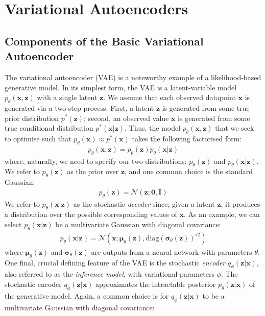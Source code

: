 \documentclass[ oneside,%
                    author={George Herbert},
                    degree={MSci},
                     title={Diffusion Models for Time-Evolving Precipitation Fields},
                  subtitle={}]{dissertation}
\begin{document}
\section{Variational Autoencoders}
\label{sec:background_vae}

\subsection{Components of the Basic Variational Autoencoder}
\label{sec:background_vae_latent}

The variational autoencoder (VAE) \cite{Autoencoding_Variational_Bayes_Kingma, Stochastic_Backpropagation_Rezende} is a noteworthy example of a likelihood-based generative model. In its simplest form, the VAE is a latent-variable model $p_\theta(\mathbf{x},\mathbf{z})$ with a single latent $\mathbf{z}$. We assume that each observed datapoint $\mathbf{x}$ is generated via a two-step process. First, a latent $\mathbf{z}$ is generated from some true prior distribution $p^*(\mathbf{z})$; second, an observed value $\mathbf{x}$ is generated from some true conditional distribution $p^*(\mathbf{x}|\mathbf{z})$. Thus, the model $p_\theta(\mathbf{x},\mathbf{z})$ that we seek to optimise such that $p_\theta(\mathbf{x})\approx p^*(\mathbf{x})$ takes the following factorised form:
\begin{align}
      p_\theta(\mathbf{x},\mathbf{z})=p_\theta(\mathbf{z})p_\theta(\mathbf{x}|\mathbf{z})
\end{align}
where, naturally, we need to specify our two distributions: $p_\theta(\mathbf{z})$ and $p_\theta(\mathbf{x}|\mathbf{z})$. We refer to $p_\theta(\mathbf{z})$ as the prior over $\mathbf{z}$, and one common choice is the standard Gaussian:
\begin{align}
      p_\theta(\mathbf{z})=\mathcal{N}(\mathbf{z};\mathbf{0}, \mathbf{I})
\end{align}
We refer to $p_\theta(\mathbf{x}|\mathbf{z})$ as the stochastic \textit{decoder} since, given a latent $\mathbf{z}$, it produces a distribution over the possible corresponding values of $\mathbf{x}$. As an example, we can select $p_\theta(\mathbf{x}|\mathbf{z})$ be a multivariate Gaussian with diagonal covariance:
\begin{align}
      p_\theta(\mathbf{x}|\mathbf{z})=\mathcal{N}(\mathbf{x}; \boldsymbol{\mu}_\theta (\mathbf{z}), \mathrm{diag}(\boldsymbol\sigma_\theta(\mathbf{z}))^{\circ 2})
\end{align}
where $\boldsymbol{\mu}_\theta(\mathbf{z})$ and $\boldsymbol\sigma_\theta(\mathbf{z})$ are outputs from a neural network with parameters $\theta$. One final, crucial defining feature of the VAE is the stochastic \textit{encoder} $q_\phi(\mathbf{z}|\mathbf{x})$, also referred to as the \textit{inference model}, with variational parameters $\phi$. The stochastic encoder $q_\phi(\mathbf{z}|\mathbf{x})$ approximates the intractable posterior $p_\theta(\mathbf{z}|\mathbf{x})$ of the generative model. Again, a common choice is for $q_\phi(\mathbf{z}|\mathbf{x})$ to be a multivariate Gaussian with diagonal covariance:
\end{document}
